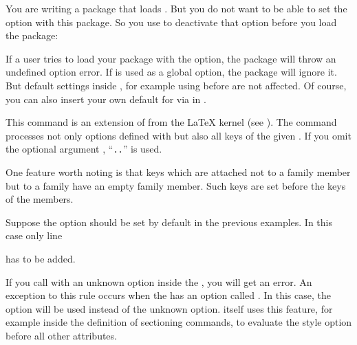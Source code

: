 \begin{Example}
  You are writing a  package that loads
  . But you do not want to be able to set the
   option with this package. So you use
   to deactivate that option before you load
  the package:
\begin{lstcode}
  \RequirePackage{scrbase}
\end{lstcode}
  If a user tries to load your package with the  option, the
   package will throw an undefined option error. If
   is used as a global option, the 
  package will ignore it. But default settings inside ,
  for example using  before
   are not affected. Of course,
  you can also insert your own default for  via
   in .
\end{Example}
\EndIndexGroup


\begin{Declaration}
\end{Declaration}
This command is an extension of  from the \LaTeX{}
kernel (see \cite{latex:clsguide}). The command processes not only options
defined with  but also all keys of the given
. If you omit the optional argument ,
``\texttt{.}\texttt{.}'' is used.

One feature worth noting is that keys which are attached not to a family
member but to a family have an empty family member. Such keys are set before
the keys of the members.
\begin{Example}
  Suppose the  option should be set by default in the
  previous examples. In this case only line
\begin{lstcode}
\end{lstcode}
  has to be added.
\end{Example}

If you call 
with an unknown option inside the , you will get an error.
An exception to this rule occurs when the  has an option called
. In this case, the  option will be used instead
of the unknown option. \KOMAScript{} itself uses this feature, for example
inside the definition of sectioning commands, to evaluate the style option
before all other attributes.

